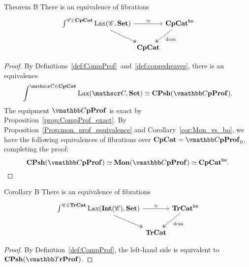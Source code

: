 \documentclass[12pt,oneside,article,draft]{memoir}
\begin{document}
\begin{named}{Theorem B}\label{thm:TheoremB}
   There is an equivalence of fibrations
   \begin{equation*}
      \begin{tikzcd}[column sep=0em]
         \int^{\cat{C}\in\CompCat}\Lax(\cat{C},\Set) \ar[rr,"\equiv"] \ar[dr,two heads]
            && \CompCat^{\bo} \ar[dl,two heads,"\dom"] \\
            & \CompCat &
      \end{tikzcd}
   \end{equation*}
\end{named}

\begin{proof}
By Definitions~\ref{def:CompProf}~and~\ref{def:copresheaves}, there is an equivalence
$$ \int^{\cat{C}\in\CompCat}\Lax(\cat{C},\Set)\equiv\CPsh(\dCompProf).$$ 
The equipment $\dCompProf$ is exact by Proposition~\ref{prop:CompProf_exact}. By Proposition~\ref{Prop:mon_prof_equivalence} and Corollary~\ref{cor:Mon_vs_bo}, we have the following equivalences of fibrations over $\CompCat=\dCompProf_0$, completing the proof:
$$\CPsh(\dCompProf)\equiv\Mon(\dCompProf)\equiv\CompCat^{\bo}.$$ 
\end{proof}

\begin{named}{Corollary B}\label{cor:CorollaryB}
   There is an equivalence of fibrations
   \begin{equation*}
      \begin{tikzcd}[column sep=0em]
         \int^{\cat{C}\in\TrCat}\Lax(\Int(\cat{C}),\Set) \ar[rr,"\equiv"] \ar[dr,two heads]
            && \TrCat^{\bo} \ar[dl,two heads,"\dom"] \\
            & \TrCat &
      \end{tikzcd}
   \end{equation*}
\end{named}

\begin{proof}
By Definition~\ref{def:CompProf}, the left-hand side is equivalent to $\CPsh(\dTrProf)$. 
\end{proof}
\end{document}
